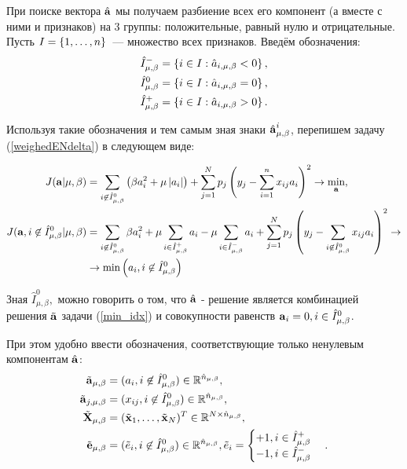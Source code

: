 
\def\cond{|}
\def\lams{{\mu,\beta}}
\def\inotnull{\not\in \hat I^0_\lams}
%


При поиске вектора $\hat{\boldsymbol{\mathbf{a}}}$ мы получаем разбиение всех его компонент (а вместе с ними и признаков) на 3 группы: положительные, равный нулю и отрицательные. Пусть $I=\left\{1,\ldots, n\right\}$~--- множество всех признаков. Введём  обозначения:
\begin{align}
	\hat I^-_\lams &= \fbr{i\in I: \hat a_{i, \lams} < 0}, \\
	\hat I^0_\lams &= \fbr{i\in I: \hat a_{i, \lams} = 0}, \\
	\hat I^+_\lams &= \fbr{i\in I: \hat a_{i, \lams} > 0}.
\end{align}

Используя такие обозначения и тем самым зная знаки $\hat{\mb a}_\lams^i$, перепишем задачу (\ref{weighedENdelta}) в следующем виде:


\begin{align}
	\label{min_idx}
	J(\mb a \cond \lams)
		&= \suml_{i\inotnull}\cbr{\beta a_i^2 + \mu \modul{a_i}}
		+ \suml_{j=1}^N p_j\cbr{y_j - \suml_{i=1}^nx_{ij}a_i}^2 \to \min_{\mb a}, \\
	J(\mb a, i\inotnull \cond \lams)
		&= \suml_{i\inotnull}\beta a_i^2 + \mu \suml_{i\in \hat I^+_\lams}a_i - \mu \suml_{i\in \hat I^-_\lams}a_i
		+ \suml_{j=1}^N p_j\cbr{y_j - \suml_{i\inotnull}x_{ij}a_i}^2 \to \\
		&\to \min\cbr{a_i, i\inotnull}
\end{align}

Зная $\hat I^0_\lams,$ можно говорить о том, что $\hat{\boldsymbol{\mathbf{a}}}$ - решение является комбинацией решения $\tilde{{\boldsymbol{\mathbf{a}}}}$ задачи (\ref{min_idx}) и совокупности равенств $\mb a_i = 0, i\in \hat I^0_\lams$.

При этом удобно ввести обозначения, соответствующие только ненулевым компонентам $\hat{\boldsymbol{\mathbf{a}}}$:
\begin{align}
	\tilde{\mb a}_\lams &= (a_i, i\inotnull) \in \mathbb{R}^{\hat n_\lams}, \\
	\tilde{\mb a}_{j,\lams} &= (x_{ij}, i\inotnull) \in \mathbb{R}^{\hat n_\lams}, \\
	\tilde{\mb X}_\lams &= (\tilde{\mb x}_1, \ldots, \tilde{\mb x}_N)^T \in \mathbb{R}^{N \times \hat n_\lams}, \\
	\tilde{\mb e}_\lams &= (\tilde e_i, i\inotnull) \in \mathbb{R}^{\hat n_\lams},
		\tilde e_i = \begcas{+1, i \in \hat I^+_\lams \\-1, i \in \hat I^-_\lams}.
\end{align}

